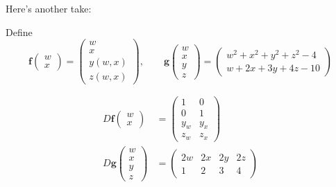 \documentclass{exam}
\newcommand{\vf}{\mathbf{f}}
\newcommand{\vg}{\mathbf{g}}
\begin{document}
\begin{questions}
    Here's another take:
    \begin{solution}
        Define
        \[
            \vf\begin{pmatrix}
                w\\x
            \end{pmatrix} = \begin{pmatrix}
                w\\x\\y(w,x)\\z(w,x)
            \end{pmatrix},\qquad
            \vg\begin{pmatrix}w\\x\\y\\z\end{pmatrix} = \begin{pmatrix}
                w^2 + x^2 + y^2 + z^2 - 4\\
                w + 2x + 3y + 4z - 10
            \end{pmatrix}
        \]

        \begin{align*}
            D\vf\begin{pmatrix}
                w\\x
            \end{pmatrix}&= \begin{pmatrix}
                1&0\\0&1\\y_w&y_x\\z_w&z_x
            \end{pmatrix}\\
            D\vg\begin{pmatrix}
                w\\x\\y\\z
            \end{pmatrix}&= \begin{pmatrix}
                2w & 2x & 2y & 2z\\
                1&2&3&4
            \end{pmatrix}
        \end{align*}


\end{solution}
\end{questions}
\end{document}
